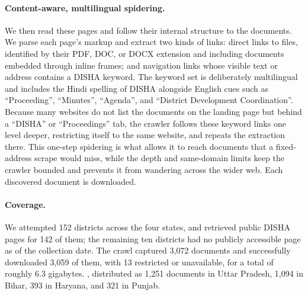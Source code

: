 \documentclass[12pt]{article}
\begin{document}
\paragraph{Content-aware, multilingual spidering.} We then read these pages and follow their internal structure to the documents. We parse each
page's markup and extract two kinds of links: direct links to files, identified
by their PDF, DOC, or DOCX extension and including documents embedded through
inline frames; and navigation links whose visible text or address contains a
DISHA keyword. The keyword set is deliberately multilingual and includes the
Hindi spelling of DISHA alongside English cues such as ``Proceeding'',
``Minutes'', ``Agenda'', and ``District Development Coordination''. Because many
websites do not list the documents on the landing page but behind a ``DISHA'' or
``Proceedings'' tab, the crawler follows these keyword links one level deeper,
restricting itself to the same website, and repeats the extraction there. This
one-step spidering is what allows it to reach documents that a fixed-address
scrape would miss, while the depth and same-domain limits keep the crawler bounded
and prevents it from wandering across the wider web. Each discovered document is downloaded.


\paragraph{Coverage.} We attempted 152 districts across the four states, and
retrieved public DISHA pages for 142 of them; the remaining ten districts had no
publicly accessible page as of the collection date. The crawl captured 3,072
documents and successfully downloaded 3,059 of them, with 13 restricted or
unavailable, for a total of roughly 6.3 gigabytes. , distributed as 1,251
documents in Uttar Pradesh, 1,094 in Bihar, 393 in Haryana, and 321 in Punjab.
\end{document}
